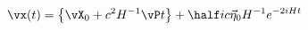 \begin{equation}
     \vx(t)=
     \big\{\vX_{0}+c^2H^{-1}\vP t\big\}
     +\half ic\vec{\eta}_{0}H^{-1}e^{-2iHt}
     \label{zitter}
\end{equation}

